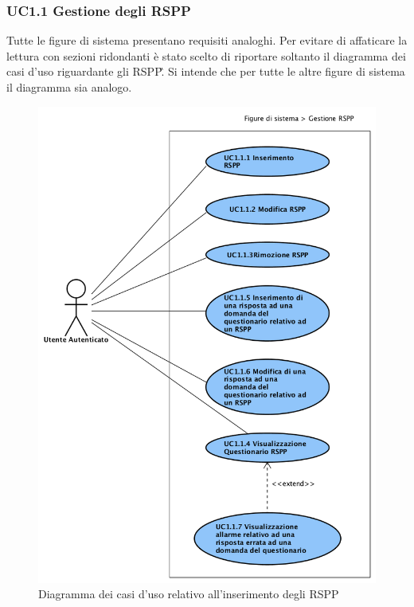 	\newpage
	\subsubsection{UC1.1 Gestione degli RSPP}
	\label{section:UC1_1}
	Tutte le figure di sistema presentano requisiti analoghi. Per evitare di affaticare la lettura con sezioni ridondanti è stato scelto di riportare soltanto il diagramma dei casi d'uso riguardante gli \gls{RSPP}\G. Si intende che per tutte le altre figure di sistema il diagramma sia analogo. 
		\begin{figure}[H]
			\begin{center}
				\includegraphics[width=12cm]{Pics/UC1_1_FigureDiSistema_RSPP.png}
				\caption{Diagramma dei casi d'uso relativo all'inserimento degli RSPP}
				\label{fig:UC1_1RSPP}
			\end{center}
		\end{figure}
